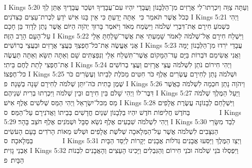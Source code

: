 I Kings 5:20	וְעַתָּה צַוֵּה וְיִכְרְתוּ־לִי אֲרָזִים מִן־הַלְּבָנוֹן וַעֲבָדַי יִהְיוּ עִם־עֲבָדֶיךָ וּשְׂכַר עֲבָדֶיךָ אֶתֵּן לְךָ כְּכֹל אֲשֶׁר תֹּאמֵר כִּי  אַתָּה יָדַעְתָּ כִּי אֵין בָּנוּ אִישׁ יֹדֵעַ לִכְרת־עֵצִים כַּצִּדֹנִים׃
I Kings 5:21	וַיְהִי כִּשְׁמֹעַ חִירָם אֶת־דִּבְרֵי שְׁלֹמֹה וַיִּשְׂמַח מְאֹד וַיֹּאמֶר בָּרוּךְ יְהֹוָה הַיּוֹם אֲשֶׁר נָתַן לְדָוִד בֵּן חָכָם עַל־הָעָם הָרָב הַזֶּה׃
I Kings 5:22	וַיִּשְׁלַח חִירָם אֶל־שְׁלֹמֹה לֵאמֹר שָׁמַעְתִּי אֵת אֲשֶׁר־שָׁלַחְתָּ אֵלָי אֲנִי אֶעֱשֶׂה אֶת־כּל־חֶפְצְךָ בַּעֲצֵי אֲרָזִים וּבַעֲצֵי בְרוֹשִׁים׃
I Kings 5:23	עֲבָדַי יֹרִדוּ מִן־הַלְּבָנוֹן יָמָּה וַאֲנִי אֲשִׂימֵם דֹּבְרוֹת בַּיָּם עַד־הַמָּקוֹם אֲשֶׁר־תִּשְׁלַח אֵלַי וְנִפַּצְתִּים שָׁם וְאַתָּה תִשָּׂא וְאַתָּה תַּעֲשֶׂה אֶת־חֶפְצִי לָתֵת לֶחֶם בֵּיתִי׃
I Kings 5:24	וַיְהִי חִירוֹם נֹתֵן לִשְׁלֹמֹה עֲצֵי אֲרָזִים וַעֲצֵי בְרוֹשִׁים כּל־חֶפְצוֹ׃
I Kings 5:25	וּשְׁלֹמֹה נָתַן לְחִירָם עֶשְׂרִים אֶלֶף כֹּר חִטִּים מַכֹּלֶת לְבֵיתוֹ וְעֶשְׂרִים כֹּר שֶׁמֶן כָּתִית כֹּה־יִתֵּן שְׁלֹמֹה לְחִירָם שָׁנָה בְשָׁנָה׃ {פ}
I Kings 5:26	וַיהֹוָה נָתַן חכְמָה לִשְׁלֹמֹה כַּאֲשֶׁר דִּבֶּר־לוֹ וַיְהִי שָׁלֹם בֵּין חִירָם וּבֵין שְׁלֹמֹה וַיִּכְרְתוּ בְרִית שְׁנֵיהֶם׃
I Kings 5:27	וַיַּעַל הַמֶּלֶךְ שְׁלֹמֹה מַס מִכּל־יִשְׂרָאֵל וַיְהִי הַמַּס שְׁלֹשִׁים אֶלֶף אִישׁ׃
I Kings 5:28	וַיִּשְׁלָחֵם לְבָנוֹנָה עֲשֶׂרֶת אֲלָפִים בַּחֹדֶשׁ חֲלִיפוֹת חֹדֶשׁ יִהְיוּ בַלְּבָנוֹן שְׁנַיִם חֳדָשִׁים בְּבֵיתוֹ וַאֲדֹנִירָם עַל־הַמַּס׃ {ס}        
I Kings 5:29	וַיְהִי לִשְׁלֹמֹה שִׁבְעִים אֶלֶף נֹשֵׂא סַבָּל וּשְׁמֹנִים אֶלֶף חֹצֵב בָּהָר׃
I Kings 5:30	לְבַד מִשָּׂרֵי הַנִּצָּבִים לִשְׁלֹמֹה אֲשֶׁר עַל־הַמְּלָאכָה שְׁלֹשֶׁת אֲלָפִים וּשְׁלֹשׁ מֵאוֹת הָרֹדִים בָּעָם הָעֹשִׂים בַּמְּלָאכָה׃ {ס}        
I Kings 5:31	וַיְצַו הַמֶּלֶךְ וַיַּסִּעוּ אֲבָנִים גְּדֹלוֹת אֲבָנִים יְקָרוֹת לְיַסֵּד הַבָּיִת אַבְנֵי גָזִית׃
I Kings 5:32	וַיִּפְסְלוּ בֹּנֵי שְׁלֹמֹה וּבֹנֵי חִירוֹם וְהַגִּבְלִים וַיָּכִינוּ הָעֵצִים וְהָאֲבָנִים לִבְנוֹת הַבָּיִת׃ {פ}
